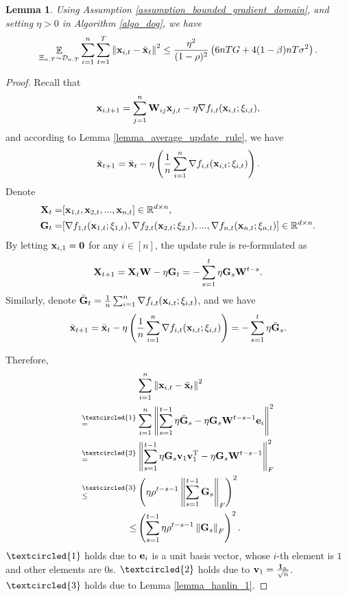 \documentclass{article}
\newtheorem{Lemma}{\bf{Lemma}}
\begin{document}
\begin{Lemma}
\label{lemma_x_variance_norm_square}
Using Assumption \ref{assumption_bounded_gradient_domain}, and setting $\eta>0$ in Algorithm \ref{algo_dog}, we have 
\begin{align}
\nonumber
\mathop{\mathbb{E}}_{ \Xi_{n,T} \sim \mathcal{D}_{n,T} } \sum_{i=1}^n\sum_{t=1}^T \left\lVert{\bf x}_{i,t} - \bar{{\bf x}}_t\right\rVert^2 \le \frac{\eta^2}{(1-\rho)^2}   \left(  6nTG + 4(1-\beta)nT \sigma^2  \right).
\end{align}

\end{Lemma}
\begin{proof}


Recall that 
\begin{align}
\nonumber
{\bf x}_{i,t+1} = \sum_{j=1}^n {\bf W}_{ij}{\bf x}_{j,t} - \eta \nabla f_{i,t}({\bf x}_{i,t};\xi_{i,t}), 
\end{align} and according to Lemma \ref{lemma_average_update_rule}, we have 
\begin{align}
\nonumber
\bar{{\bf x}}_{t+1} = \bar{{\bf x}}_t - \eta \left( \frac{1}{n}\sum_{i=1}^n \nabla f_{i,t}({\bf x}_{i,t};\xi_{i,t}) \right).
\end{align} Denote 
\begin{align}
\nonumber
{\bf X}_t = &  [{\bf x}_{1,t}, {\bf x}_{2,t}, ..., {\bf x}_{n,t}] \in \mathbb{R}^{d\times n}, \\ \nonumber
{\bf G}_t = & [\nabla f_{1,t}({\bf x}_{1,t};\xi_{1,t}), \nabla f_{2,t}({\bf x}_{2,t};\xi_{2,t}), ..., \nabla f_{n,t}({\bf x}_{n,t};\xi_{n,t})] \in \mathbb{R}^{d\times n}.
\end{align} By letting ${\bf x}_{i,1} = {\bf 0}$ for any $i\in[n]$, the update rule is re-formulated as 
\begin{align}
\nonumber
{\bf X}_{t+1} = {\bf X}_t {\bf W} - \eta {\bf G}_t = - \sum_{s=1}^t \eta {\bf G}_s {\bf W}^{t-s}. 
\end{align} Similarly, denote $\bar{{\bf G}}_t = \frac{1}{n}\sum_{i=1}^n \nabla f_{i,t}({\bf x}_{i,t};\xi_{i,t})$, and we have
\begin{align}
\bar{{\bf x}}_{t+1} = \bar{{\bf x}}_t - \eta \left( \frac{1}{n}\sum_{i=1}^n \nabla f_{i,t}({\bf x}_{i,t};\xi_{i,t}) \right) = - \sum_{s=1}^t \eta \bar{{\bf G}}_s. 
\end{align}


Therefore, 
\begin{align}
\nonumber
& \sum_{i=1}^n \lrnorm{\x_{i,t} - \bar{\x}_t}^2 \\ \nonumber
\refabovecir{=}{\textcircled{1}} & \sum_{i=1}^n \lrnorm{ \sum_{s=1}^{t-1} \eta \bar{\G}_s - \eta \G_s \W^{t-s-1}\e_i }^2   \\ \nonumber
\refabovecir{=}{\textcircled{2}} & \lrnorm{ \sum_{s=1}^{t-1} \eta \G_s\v_1 \v_1\Tr - \eta \G_s \W^{t-s-1} }^2_F   \\ \nonumber
\refabovecir{\le}{\textcircled{3}} & \lrincir{ \eta \rho^{t-s-1} \lrnorm{\sum_{s=1}^{t-1}\G_s}_F}^2 \\ \nonumber
\le & \lrincir{ \sum_{s=1}^{t-1} \eta \rho^{t-s-1} \lrnorm{\G_s}_F}^2.
\end{align} $\textcircled{1}$ holds due to ${\bf e}_i$ is a unit basis vector, whose $i$-th element is $1$ and other elements are $0$s. $\textcircled{2}$ holds due to ${\bf v}_1 = \frac{{\bf 1}_n}{\sqrt{n}}$. $\textcircled{3}$ holds due to Lemma \ref{lemma_hanlin_1}. 



\end{proof}
\end{document}
